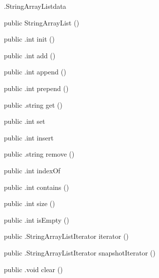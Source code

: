 \begin{CrexxClass}{.StringArrayList}{data}

  \begin{Hierarchy}
  \end{Hierarchy}

  \begin{Members}

    \Factory
      {public}
      {StringArrayList}
      {()}

    \Method
      {public}
      {.int}
      {init}
      {()}

    \Method
      {public}
      {.int}
      {add}
      {()}

    \Method
      {public}
      {.int}
      {append}
      {()}

    \Method
      {public}
      {.int}
      {prepend}
      {()}

    \Method
      {public}
      {.string}
      {get}
      {()}

    \Method
      {public}
      {.int}
      {set}
      {}

    \Method
      {public}
      {.int}
      {insert}
      {}

    \Method
      {public}
      {.string}
      {remove}
      {()}

    \Method
      {public}
      {.int}
      {indexOf}
      {}

    \Method
      {public}
      {.int}
      {contains}
      {()}

    \Method
      {public}
      {.int}
      {size}
      {()}

    \Method
      {public}
      {.int}
      {isEmpty}
      {()}

    \Method
      {public}
      {.StringArrayListIterator}
      {iterator}
      {()}

    \Method
      {public}
      {.StringArrayListIterator}
      {snapshotIterator}
      {()}

    \Method
      {public}
      {.void}
      {clear}
      {()}

  \end{Members}
\end{CrexxClass}


